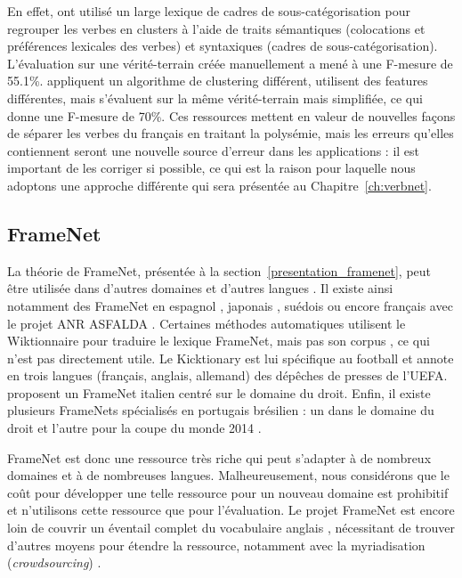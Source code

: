 En effet, \cite{sun2010investigating} ont utilisé un large lexique de cadres de
sous-catégorisation \citep{messiant2010acquisition} pour regrouper les verbes
en clusters à l'aide de traits sémantiques (colocations et préférences
lexicales des verbes) et syntaxiques (cadres de sous-catégorisation).
L'évaluation sur une vérité-terrain créée manuellement a mené à une F-mesure de
55.1\%.  \cite{falk2012classifying} appliquent un algorithme de clustering
différent, utilisent des features différentes, mais s'évaluent sur la même
vérité-terrain mais simplifiée, ce qui donne une F-mesure de 70\%.  Ces
ressources mettent en valeur de nouvelles façons de séparer les verbes du
français en traitant la polysémie, mais les erreurs qu'elles contiennent seront
une nouvelle source d'erreur dans les applications : il est important de les
corriger si possible, ce qui est la raison pour laquelle nous adoptons une
approche différente qui sera présentée au Chapitre~\ref{ch:verbnet}.

\subsection{FrameNet}
\label{traduction_framenet}

La théorie de FrameNet, présentée à la section~\ref{presentation_framenet},
peut être utilisée dans d'autres domaines et d'autres langues
\citep{boas2009multilingual}. Il existe ainsi notamment des FrameNet en
espagnol \citep{subirats2003surprise}, japonais \citep{ohara2004japanese},
suédois \citep{heppin2012rocky} ou encore français avec le projet ANR ASFALDA
\citep{candito2014developing}. Certaines méthodes automatiques utilisent le
Wiktionnaire pour traduire le lexique FrameNet, mais pas son corpus
\citep{mouton2010framenet,hartmann2013framenet}, ce qui n'est pas directement
utile. Le Kicktionary \citep{schmidt2009kicktionary} est lui spécifique au
football et annote en trois langues (français, anglais, allemand) des dépêches
de presses de l'UEFA.  \cite{venturi2009towards} proposent un FrameNet italien
centré sur le domaine du droit. Enfin, il existe plusieurs FrameNets
spécialisés en portugais brésilien : un dans le domaine du droit
\citep{bertoldi2012frame} et l'autre pour la coupe du monde 2014
\citep{torrent2014copa}.

FrameNet est donc une ressource très riche qui peut s'adapter à de nombreux
domaines et à de nombreuses langues. Malheureusement, nous considérons que le
coût pour développer une telle ressource pour un nouveau domaine est prohibitif
et n'utilisons cette ressource que pour l'évaluation. Le projet FrameNet est
encore loin de couvrir un éventail complet du vocabulaire anglais
\citep[section~5.4]{marquez2008semantic}, nécessitant de trouver d'autres moyens pour
étendre la ressource, notamment avec la myriadisation (\textit{crowdsourcing})
\citep{fossati2013outsourcing,baker2014framenet}.

